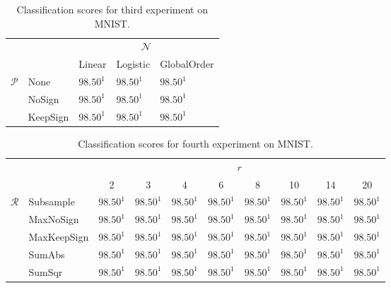 \documentclass[12pt,a4paper,oneside,english]{UPBThesis}
\begin{document}
\renewcommand{\arraystretch}{1.2}
\begin{table}
  \caption{Classification scores for third experiment on MNIST.}
  \label{table:RecoderEvMNISTSmallResultsNP}
  \begin{tabularx}{\textwidth}{cR|R|R|R|}
    & &  \tabularnewline
    & & Linear & Logistic & GlobalOrder \tabularnewline\hline
     & None & $98.50^1$ & $98.50^1$ & $98.50^1$ \tabularnewline
     & NoSign & $98.50^1$ & $98.50^1$ & $98.50^1$ \tabularnewline
     & KeepSign & $98.50^1$ & $98.50^1$ & $98.50^1$ \tabularnewline\hline
  \end{tabularx}
\end{table}
\renewcommand{\arraystretch}{1.0}

\renewcommand{\arraystretch}{1.2}
\begin{table}
  \caption{Classification scores for fourth experiment on MNIST.}
  \label{table:RecoderEvMNISTSmallResultsRr}
  \begin{tabularx}{\textwidth}{cR|c|c|c|c|c|c|c|c|}
    & &  \tabularnewline
    &            & 2 & 3 & 4 & 6 & 8 & 10 & 14 & 20 \tabularnewline\hline
     & Subsample   & $98.50^1$ & $98.50^1$ & $98.50^1$ & $98.50^1$ & $98.50^1$ & $98.50^1$ & $98.50^1$ & $98.50^1$ \tabularnewline
     & MaxNoSign   & $98.50^1$ & $98.50^1$ & $98.50^1$ & $98.50^1$ & $98.50^1$ & $98.50^1$ & $98.50^1$ & $98.50^1$ \tabularnewline
     & MaxKeepSign & $98.50^1$ & $98.50^1$ & $98.50^1$ & $98.50^1$ & $98.50^1$ & $98.50^1$ & $98.50^1$ & $98.50^1$ \tabularnewline
     & SumAbs      & $98.50^1$ & $98.50^1$ & $98.50^1$ & $98.50^1$ & $98.50^1$ & $98.50^1$ & $98.50^1$ & $98.50^1$ \tabularnewline
     & SumSqr      & $98.50^1$ & $98.50^1$ & $98.50^1$ & $98.50^1$ & $98.50^1$ & $98.50^1$ & $98.50^1$ & $98.50^1$ \tabularnewline\hline
  \end{tabularx}
\end{table}
\renewcommand{\arraystretch}{1.0}
\end{document}
